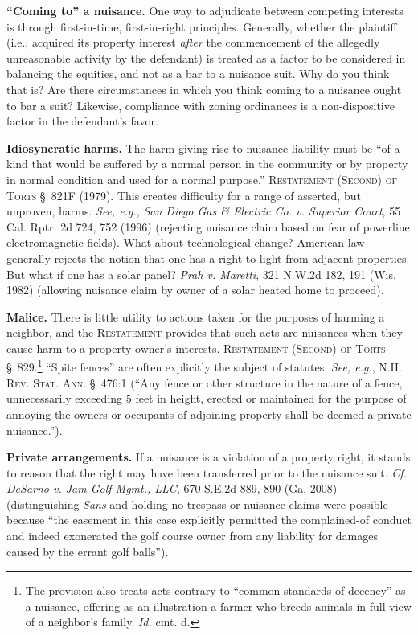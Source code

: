 \item \textbf{``Coming to'' a nuisance.} One way to adjudicate between
competing interests is through first-in-time, first-in-right principles.
Generally, whether the plaintiff  (i.e., acquired its
property interest \textit{after} the commencement of the allegedly unreasonable
activity by the defendant) is treated as a factor to be considered in balancing
the equities, and not as a bar to a nuisance suit. Why do you think that is? Are
there circumstances in which you think coming to a nuisance ought to bar a suit?
Likewise, compliance with zoning ordinances is a non-dispositive factor in the
defendant's favor. 

\item \textbf{Idiosyncratic harms.} The harm giving rise to nuisance liability
must be ``of a kind that would be suffered by a normal person in the community
or by property in normal condition and used for a normal purpose.''
\textsc{Restatement (Second) of Torts} \S~821F (1979). This creates difficulty
for a range of asserted, but unproven, harms. \textit{See, e.g.}, \emph{San
Diego Gas \& Electric Co. v. Superior Court}, 55 Cal. Rptr. 2d 724, 752 (1996)
(rejecting nuisance claim based on fear of powerline electromagnetic fields).
What about technological change? American law generally rejects the notion that
one has a right to light from adjacent properties. But what if one has a solar
panel? \emph{Prah v. Maretti}, 321 N.W.2d 182, 191 (Wis. 1982) (allowing
nuisance claim by owner of a solar heated home to proceed). 

\item \textbf{Malice.} There is little utility to actions taken for the purposes
of harming a neighbor, and the \textsc{Restatement} provides that such acts are
nuisances when they cause harm to a property owner's interests.
\textsc{Restatement (Second) of Torts} \S~829.\footnote{The provision also
treats acts contrary to ``common standards of decency'' as a nuisance, offering
as an illustration a farmer who breeds animals in full view of a neighbor's
family. \textit{Id.} cmt. d.} ``Spite fences'' are often explicitly the subject
of statutes. \textit{See, e.g.}, \textsc{N.H. Rev. Stat. Ann.} \S~476:1 (``Any
fence or other structure in the nature of a fence, unnecessarily exceeding 5
feet in height, erected or maintained for the purpose of annoying the owners or
occupants of adjoining property shall be deemed a private nuisance.'').

\item \textbf{Private arrangements.} If a nuisance is a violation of a property
right, it stands to reason that the right may have been transferred prior to the
nuisance suit. \textit{Cf.} \emph{DeSarno v. Jam Golf Mgmt., LLC}, 670 S.E.2d
889, 890 (Ga. 2008) (distinguishing \textit{Sans} and holding no trespass or
nuisance claims were possible because ``the easement in this case explicitly
permitted the complained-of conduct and indeed exonerated the golf course owner
from any liability for damages caused by the errant golf balls'').


